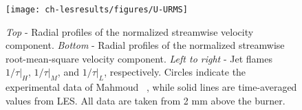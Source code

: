 \begin{figure}[htb]
  \centering
  \texttt{[image: ch-lesresults/figures/U-URMS]}
  \caption[Fuel-Side Flow Field Boundary Conditions]{\textit{Top} - Radial profiles of the normalized streamwise velocity component. \textit{Bottom} - Radial profiles of the normalized streamwise root-mean-square velocity component. \textit{Left to right} - Jet flames $1/\tau|_H$, $1/\tau|_M$, and $1/\tau|_L$, respectively. Circles indicate the experimental data of Mahmoud \etal~\cite{mahmoud2017}, while solid lines are time-averaged values from LES. All data are taken from 2 mm above the burner.}
  \label{fig:lesresults:bc:uurms}
\end{figure}
